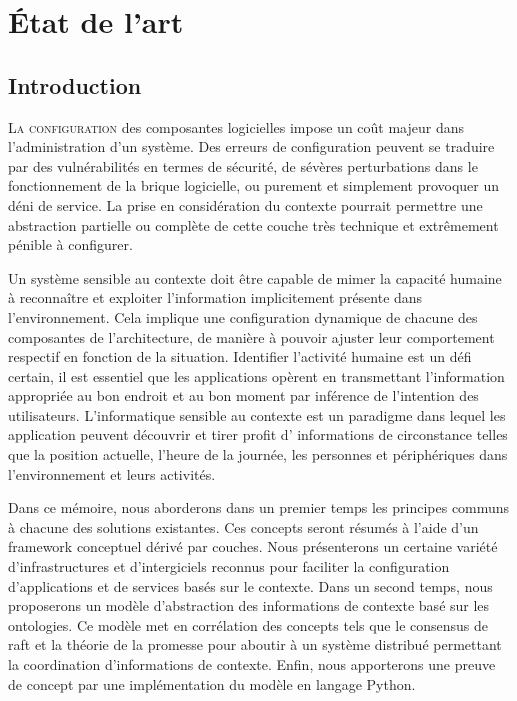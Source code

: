 \chapter{État de l'art}

\section{Introduction}

\lettrine{L}{a configuration} des composantes logicielles impose un coût majeur
dans l'administration d'un système. Des erreurs de configuration peuvent se
traduire par des vulnérabilités en termes de sécurité, de sévères perturbations
dans le fonctionnement de la brique logicielle, ou purement et simplement
provoquer un déni de service. La prise en considération du contexte pourrait
permettre une abstraction partielle ou complète de cette couche très technique
et extrêmement pénible à configurer.

Un système sensible au contexte doit être capable de mimer la capacité humaine à
reconnaître et exploiter l'information implicitement présente dans
l'environnement. Cela implique une configuration dynamique de chacune des
composantes de l'architecture, de manière à pouvoir ajuster leur comportement
respectif en fonction de la situation. Identifier l'activité humaine est un
défi certain, il est essentiel que les applications opèrent en transmettant
l'information appropriée au bon endroit et au bon moment par inférence de
l'intention des utilisateurs. L'informatique sensible au contexte est un
paradigme dans lequel les application peuvent découvrir et tirer profit d'
informations de circonstance telles que la position actuelle, l'heure de la
journée, les personnes et périphériques dans l'environnement et leurs activités.

Dans ce mémoire, nous aborderons dans un premier temps les principes communs à
chacune des solutions existantes. Ces concepts seront résumés à l'aide d'un
framework conceptuel dérivé par couches. Nous présenterons un certaine variété
d'infrastructures et d'intergiciels reconnus pour faciliter la configuration
d'applications et de services basés sur le contexte. Dans un second temps, nous
proposerons un modèle d'abstraction des informations de contexte basé sur les
ontologies. Ce modèle met en corrélation des concepts tels que le consensus de
raft et la théorie de la promesse pour aboutir à un système distribué permettant
la coordination d'informations de contexte. Enfin, nous apporterons une preuve de
concept par une implémentation du modèle en langage Python.

